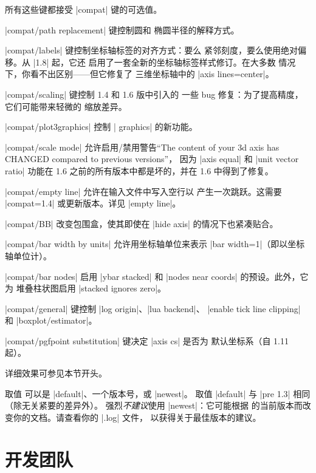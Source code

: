 \begin{pgfplotskey}
\begin{pgfplotskeylist}
        所有这些键都接受 |compat| 键的可选值。

        |compat/path replacement| 键控制圆和
        椭圆半径的解释方式。

        |compat/labels| 键控制坐标轴标签的对齐方式：要么
        紧邻刻度，要么使用绝对偏移。从 |1.8| 起，它还
        启用了一套全新的坐标轴标签样式修订。在大多数
        情况下，你看不出区别——但它修复了
        三维坐标轴中的 |axis lines=center|。

        |compat/scaling| 键控制 1.4 和 1.6 版中引入的
        一些 bug 修复：为了提高精度，它们可能带来轻微的
        缩放差异。

        |compat/plot3graphics| 控制
        | graphics| 的新功能。

        |compat/scale mode| 允许启用/禁用警告“The
        content of your 3d axis has CHANGED compared to previous versions”，
        因为 |axis equal| 和 |unit vector ratio| 功能在
        1.6 之前的所有版本中都是坏的，并在 1.6 中得到了修复。

        |compat/empty line| 允许在输入文件中写入空行以
        产生一次跳跃。这需要 |compat=1.4| 或更新版本。详见
        |empty line|。

        |compat/BB| 改变包围盒，使其即使在
        |hide axis| 的情况下也紧凑贴合。

        |compat/bar width by units| 允许用坐标轴单位来表示
        |bar width=1|（即以坐标轴单位计）。

        |compat/bar nodes| 启用 |ybar stacked| 和
        |nodes near coords| 的预设。此外，它为
        堆叠柱状图启用 |stacked ignores zero|。

        |compat/general| 键控制 |log origin|、|lua backend|、
        |enable tick line clipping| 和 |boxplot/estimator|。

        |compat/pgfpoint substitution| 键决定 |axis cs| 是否为
        默认坐标系（自 1.11 起）。

        详细效果可参见本节开头。
    \end{pgfplotskeylist}

    取值  可以是 |default|、一个版本号，或 |newest|。
    取值 |default| 与 |pre 1.3| 相同（除无关紧要的差异外）。
    强烈\emph{不建议}使用 |newest|：它可能根据 \PGFPlots{}
    的当前版本而改变你的文档。请查看你的 |.log| 文件，
    以获得关于最佳版本的建议。
\end{pgfplotskey}


\section{开发团队}

